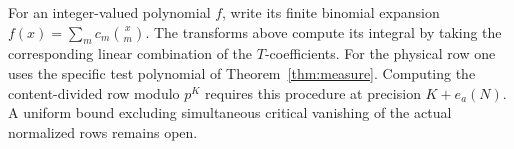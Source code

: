 \documentclass[11pt]{article}
\begin{document}
For an integer-valued polynomial $f$, write its finite binomial
expansion $f(x)=\sum_m c_m\binom xm$. The transforms above
compute its integral by taking the corresponding linear
combination of the $T$-coefficients. For the physical row
one uses the specific test polynomial of Theorem~\ref{thm:measure}.
Computing the content-divided row modulo $p^K$ requires this
procedure at precision $K+e_a(N)$.
A uniform bound excluding simultaneous critical vanishing of
the actual normalized rows remains open.
\end{document}

